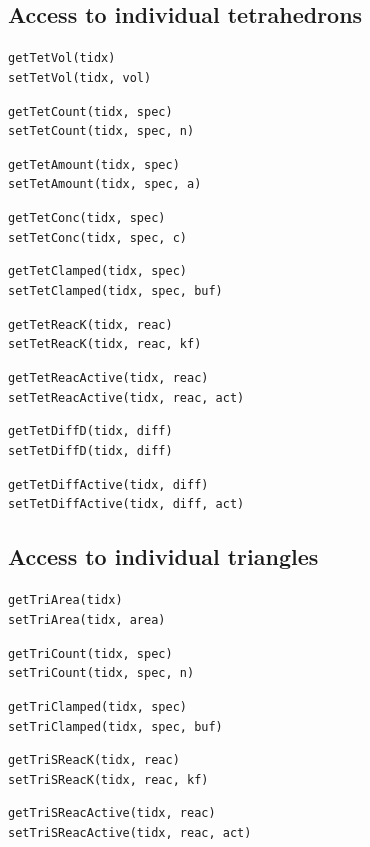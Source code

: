 \documentclass[a4paper,12pt]{book}
\begin{document}
\subsection{Access to individual tetrahedrons}
{\setlength{\parskip}{12pt} \setlength{\parindent}{0pt}
\texttt{getTetVol(tidx)}\\
\texttt{setTetVol(tidx, vol)}

\texttt{getTetCount(tidx, spec)}\\
\texttt{setTetCount(tidx, spec, n)}

\texttt{getTetAmount(tidx, spec)}\\
\texttt{setTetAmount(tidx, spec, a)}

\texttt{getTetConc(tidx, spec)}\\
\texttt{setTetConc(tidx, spec, c)}

\texttt{getTetClamped(tidx, spec)}\\
\texttt{setTetClamped(tidx, spec, buf)}

\texttt{getTetReacK(tidx, reac)}\\
\texttt{setTetReacK(tidx, reac, kf)}

\texttt{getTetReacActive(tidx, reac)}\\
\texttt{setTetReacActive(tidx, reac, act)}

\texttt{getTetDiffD(tidx, diff)}\\
\texttt{setTetDiffD(tidx, diff)}

\texttt{getTetDiffActive(tidx, diff)}\\
\texttt{setTetDiffActive(tidx, diff, act)}
}
\subsection{Access to individual triangles}
{\setlength{\parskip}{12pt} \setlength{\parindent}{0pt}
\texttt{getTriArea(tidx)}\\
\texttt{setTriArea(tidx, area)}

\texttt{getTriCount(tidx, spec)}\\
\texttt{setTriCount(tidx, spec, n)}

\texttt{getTriClamped(tidx, spec)}\\
\texttt{setTriClamped(tidx, spec, buf)}

\texttt{getTriSReacK(tidx, reac)}\\
\texttt{setTriSReacK(tidx, reac, kf)}

\texttt{getTriSReacActive(tidx, reac)}\\
\texttt{setTriSReacActive(tidx, reac, act)}
}


\end{document}

